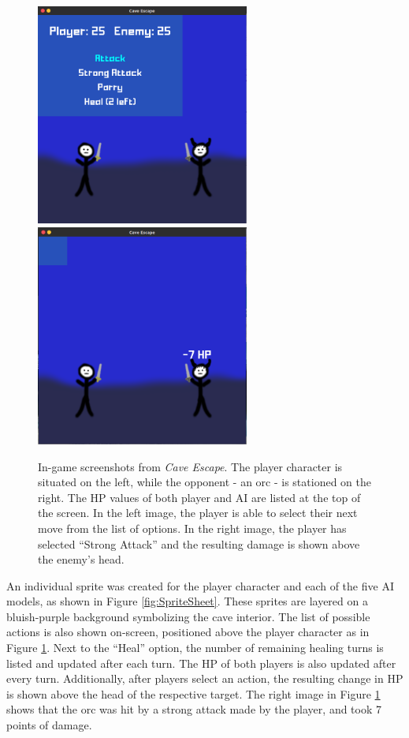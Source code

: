\begin{figure}[H]
  \centering
  \includegraphics[width=7cm]{figures/In-Game.png}
  \includegraphics[width=7cm]{figures/In-Game2.png}
  \caption{In-game screenshots from \textit{Cave Escape}. The player character is situated on the left, while the opponent - an orc - is stationed on the right. The HP values of both player and AI are listed at the top of the screen. In the left image, the player is able to select their next move from the list of options. In the right image, the player has selected ``Strong Attack'' and the resulting damage is shown above the enemy's head.}
  \label{fig:ingame}
\end{figure}

An individual sprite was created for the player character and each of the five AI models, as shown in Figure \ref{fig:SpriteSheet}. These sprites are layered on a bluish-purple background symbolizing the cave interior. The list of possible actions is also shown on-screen, positioned above the player character as in Figure \ref{fig:ingame}. Next to the ``Heal'' option, the number of remaining healing turns is listed and updated after each turn. The HP of both players is also updated after every turn. Additionally, after players select an action, the resulting change in HP is shown above the head of the respective target. The right image in Figure \ref{fig:ingame} shows that the orc was hit by a strong attack made by the player, and took 7 points of damage.\\

